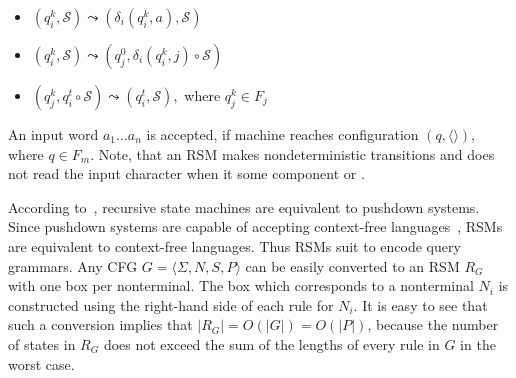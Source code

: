 \begin{itemize}
    \item $(q_i^k,\mathcal{S}) \leadsto (\delta_i (q_i^k, a),\mathcal{S})$
    \item $(q_i^k,\mathcal{S}) \leadsto (q_j^0, \delta_i (q_i^k, j) \circ\mathcal{S})$
    \item $(q_j^k,q_i^t\circ \mathcal{S}) \leadsto (q_i^t, \mathcal{S}),$ where $q_j^k \in F_j$ 
\end{itemize}

An input word $a_1 \dots a_n$ is accepted, if machine reaches configuration $(q,\langle\rangle)$, where $q \in F_m$.
Note, that an RSM makes nondeterministic transitions and does not read the input character when it  some component or .

According to~\cite{rsm:analysis:10.1007/3-540-44585-4_18}, recursive state machines are equivalent to pushdown systems.
Since pushdown systems are capable of accepting context-free languages~\citep{automata:theory:10.5555/1177300}, RSMs are equivalent to context-free languages.
Thus RSMs suit to encode query grammars.
Any CFG $G=\langle\Sigma, N, S, P\rangle$ can be easily converted to an RSM $R_G$ with one box per nonterminal.
The box which corresponds to a nonterminal $N_i$ is constructed using the right-hand side of each rule for $N_i$.
It is easy to see that such a conversion implies that $|R_G| = O(|G|) = O(|P|)$, because the number of states in $R_G$ does not exceed the sum of the lengths of every rule in $G$ in the worst case.

